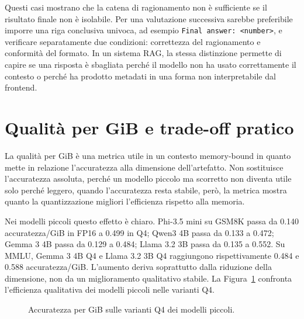 Questi casi mostrano che la catena di ragionamento non è sufficiente se il
risultato finale non è isolabile. Per una valutazione successiva
sarebbe preferibile imporre una riga conclusiva univoca, ad esempio
\texttt{Final answer: <number>}, e verificare separatamente due condizioni:
correttezza del ragionamento e conformità del formato. In un sistema RAG, la
stessa distinzione permette di capire se una risposta è sbagliata perché il
modello non ha usato correttamente il contesto o perché ha prodotto metadati in
una forma non interpretabile dal frontend.

\section{Qualità per GiB e trade-off pratico}
\label{sec:evaluation_quality_per_gib}

La qualità per GiB è una metrica utile in un contesto memory-bound in quanto mette 
in relazione l'accuratezza alla dimensione dell'artefatto. Non sostituisce
l'accuratezza assoluta, perché un modello piccolo ma scorretto non diventa
utile solo perché leggero, quando l'accuratezza resta stabile, però, la
metrica mostra quanto la quantizzazione migliori l'efficienza rispetto alla
memoria.

Nei modelli piccoli questo effetto è chiaro. Phi-3.5 mini su GSM8K passa da
0.140 accuratezza/GiB in FP16 a 0.499 in Q4; Qwen3 4B passa da 0.133 a 0.472;
Gemma 3 4B passa da 0.129 a 0.484; Llama 3.2 3B passa da 0.135 a 0.552. Su
MMLU, Gemma 3 4B Q4 e Llama 3.2 3B Q4 raggiungono rispettivamente 0.484 e
0.588 accuratezza/GiB. L'aumento deriva soprattutto dalla riduzione della
dimensione, non da un miglioramento qualitativo stabile.
La Figura~\ref{fig:quality_per_gib_q4} confronta l'efficienza qualitativa dei
modelli piccoli nelle varianti Q4.

\begin{figure}[ht]
  \centering
  \caption{Accuratezza per GiB sulle varianti Q4 dei modelli piccoli.}
  \label{fig:quality_per_gib_q4}
\end{figure}

